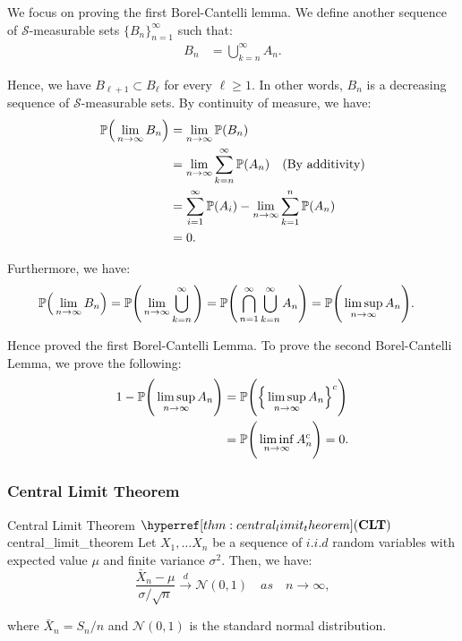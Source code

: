 \begin{proof*}
    We focus on proving the first Borel-Cantelli lemma. We define another sequence of $\mathcal{S}$-measurable sets $\{B_n\}_{n=1}^\infty$ such that:
    \begin{align*}
        B_n &= \bigcup_{k=n}^\infty A_n.
    \end{align*}

    \noindent Hence, we have $B_{\ell+1}\subset B_\ell$ for every $\ell\ge 1$. In other words, $B_n$ is a decreasing sequence of $\mathcal{S}$-measurable sets. By continuity of measure, we have:
    \begin{align*}
        \mathbb{P}\Big( \lim_{n\to\infty} B_n \Big) &= \lim_{n\to\infty} \mathbb{P}(B_n) \\
            &= \lim_{n\to\infty} \sum_{k=n}^\infty \mathbb{P}(A_n) \quad \text{(By additivity)} \\
            &= \sum_{i=1}^\infty\mathbb{P}(A_i) - \lim_{n\to\infty} \sum_{k=1}^n \mathbb{P}(A_n) \\
            &= 0.
    \end{align*}

    \noindent Furthermore, we have:
    \begin{align*}
        \mathbb{P}\Big( \lim_{n\to\infty} B_n \Big) &= \mathbb{P}\Bigg( \lim_{n\to\infty} \bigcup_{k=n}^\infty \Bigg) = \mathbb{P}\Bigg( \bigcap_{n=1}^\infty \bigcup_{k=n}^\infty A_n \Bigg) = \mathbb{P}\Bigg( \limsup_{n\to\infty} A_n \Bigg).
    \end{align*}

    \noindent Hence proved the first Borel-Cantelli Lemma. To prove the second Borel-Cantelli Lemma, we prove the following:
    \begin{align*}
        1 - \mathbb{P}\Bigg( \limsup_{n\to\infty} A_n \Bigg) &= \mathbb{P}\Bigg( \Big\{ \limsup_{n\to\infty} A_n \Big\}^c \Bigg) \\
        &= \mathbb{P}\Bigg( \liminf_{n\to\infty} A_n^c \Bigg) = 0.
    \end{align*}
\end{proof*}


\subsubsection{Central Limit Theorem}
\begin{theorem}{Central Limit Theorem $\CLT$}{central_limit_theorem}
    Let $X_1, \dots X_n$ be a sequence of $i.i.d$ random variables with expected value $\mu$ and finite variance $\sigma^2$. Then, we have:
    \begin{equation}
        \frac{\bar X_n - \mu}{\sigma/\sqrt{n}} \xrightarrow{d} \mathcal{N}(0, 1) \quad as \quad n \to \infty,
    \end{equation}

    \noindent where $\bar X_n = S_n/n$ and $\mathcal{N}(0,1)$ is the standard normal distribution.
\end{theorem}

